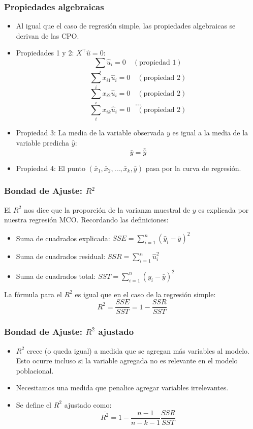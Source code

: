 \documentclass{beamer}
\begin{document}
\begin{frame}[shrink=10]
\frametitle{Propiedades algebraicas}

\begin{itemize}
    \item Al igual que el caso de regresión simple, las propiedades algebraicas se derivan de las CPO.
    \item Propiedades 1 y 2: $X^\top \hat{u} = 0$:
    \[ \sum_{i} \hat{u}_i = 0 \quad (\text{propiedad 1}) \]
    \[ \sum_{i} x_{i1} \hat{u}_i = 0 \quad (\text{propiedad 2}) \]
    \[ \sum_{i} x_{i2} \hat{u}_i = 0 \quad (\text{propiedad 2}) \]
    \[ \dots \]
    \[ \sum_{i} x_{ik} \hat{u}_i = 0 \quad (\text{propiedad 2}) \]
    \item Propiedad 3: La media de la variable observada $y$ es igual a la media de la variable predicha $\hat{y}$:
    \[ \bar{y} = \bar{\hat{y}} \]
    \item Propiedad 4: El punto $(\bar{x}_1, \bar{x}_2, \dots, \bar{x}_k, \bar{y})$ pasa por la curva de regresión.
\end{itemize}

\end{frame}
\begin{frame}
\frametitle{Bondad de Ajuste: $R^2$}


El $R^2$ nos dice que la proporción de la varianza muestral de $y$ es explicada por nuestra regresión MCO. Recordando las definiciones:
\begin{itemize}
    \item Suma de cuadrados explicada: $SSE = \sum_{i=1}^{n} (\hat{y}_i - \bar{y})^2$
    \item Suma de cuadrados residual: $SSR = \sum_{i=1}^{n} \hat{u}_i^2$
    \item Suma de cuadrados total: $SST = \sum_{i=1}^{n} (y_i - \bar{y})^2$
\end{itemize}

La fórmula para el $R^2$ es igual que en el caso de la regresión simple:
\[ R^2 = \frac{SSE}{SST} = 1 - \frac{SSR}{SST} \]
\end{frame}
\begin{frame}
\frametitle{Bondad de Ajuste: $R^2$ ajustado}

\begin{itemize}
    \item $R^2$ crece (o queda igual) a medida que se agregan más variables al modelo. Esto ocurre incluso si la variable agregada no es relevante en el modelo poblacional.
    \item Necesitamos una medida que penalice agregar variables irrelevantes.
    \item Se define el $R^2$ ajustado como:
    \[ \overline{R^2} = 1 - \frac{n - 1}{n - k - 1} \frac{SSR}{SST} \]
\end{itemize}

\end{frame}
\end{document}
